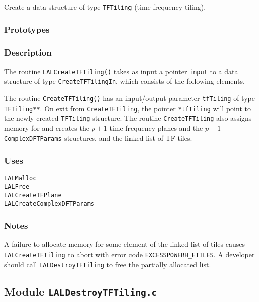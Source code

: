Create a data structure of type \verb+TFTiling+ (time-frequency tiling).

\subsubsection*{Prototypes}
\vspace{0.1in}


\subsubsection*{Description}

The routine \verb+LALCreateTFTiling()+ takes as input a pointer \verb+input+
to a data structure of type \verb+CreateTFTilingIn+, which consists of the
following elements.

The routine \verb+CreateTFTiling()+ has an input/output parameter
\verb+tfTiling+ of type \verb+TFTiling**+.  On exit from
\verb+CreateTFTiling+, the pointer \verb+*tfTiling+ will point to the newly
created \verb+TFTiling+ structure.  The routine \verb+CreateTFTiling+ also
assigns memory for and creates the $p+1$ time frequency planes and the $p+1$
\verb+ComplexDFTParams+ structures, and the linked list of TF tiles.

\subsubsection*{Uses}
\begin{verbatim}
LALMalloc
LALFree
LALCreateTFPlane
LALCreateComplexDFTParams
\end{verbatim}

\subsubsection*{Notes}
A failure to allocate memory for some element of the linked list of tiles
causes \verb+LALCreateTFTiling+ to abort with error code
\verb+EXCESSPOWERH_ETILES+.  A developer should call \verb+LALDestroyTFTiling+
to free the partially allocated list.   

\vfill{\footnotesize}

\newpage
\subsection{Module \texttt{LALDestroyTFTiling.c}}
\label{ss:LALDestroyTFTiling.c}

